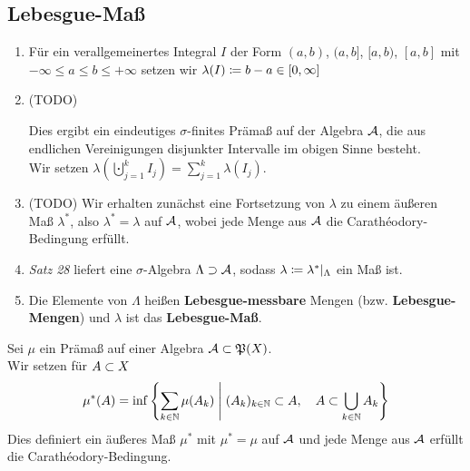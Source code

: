 \documentclass[skript.tex]{subfiles}
\begin{document}
	
	\subsection*{Lebesgue-Maß}
		\begin{enumerate}[(1)]
			\item Für ein verallgemeinertes Integral $I$ der Form
			$(a,b)$, $(a,b]$, $[a,b)$, $[a,b]$ mit \\ $-\infty \leq a \leq b \leq +\infty$ setzen wir
			$\lambda(I) \coloneqq b-a \in [0,\infty]$
			\item (TODO)
				\begin{lem}
					\unskip
					Dies ergibt ein eindeutiges $\sigma$-finites Prämaß auf der Algebra $\mathcal{A}$,
					die aus endlichen Vereinigungen disjunkter Intervalle im obigen Sinne besteht. \\
					Wir setzen
					$\lambda{\left(\bigcupdot_{j=1}^k I_j \right)} = \sum_{j=1}^k \lambda(I_j)$.
				\end{lem}
			\item (TODO) Wir erhalten zunächst eine Fortsetzung von $\lambda$ zu einem äußeren Maß
				$\lambda^*$, also $\lambda^*=\lambda$ auf $\mathcal{A}$, wobei jede Menge aus
				$\mathcal{A}$ die Carathéodory-Bedingung erfüllt.
			\item \emph{Satz 28} liefert eine $\sigma$-Algebra $\Lambda\supset\mathcal{A}$, sodass 
				$\lambda \coloneqq \lambda^*{\mid_\Lambda}$ ein Maß ist.
			\item
				\begin{defin}
					\unskip
					Die Elemente von $\Lambda$ heißen \textbf{Lebesgue-messbare} Mengen (bzw.
					\textbf{Lebesgue-Mengen}) und $\lambda$ ist das \textbf{Lebesgue-Maß}.
				\end{defin}
		\end{enumerate}
		
		\addtocounter{cntr}{-3} %
		\begin{lem}[Ad 3]
			Sei $\mu$ ein Prämaß auf einer Algebra $\mathcal{A} \subset \mathfrak{P}(X)$. \\
			Wir setzen für $A \subset X$
			\[
				\mu^*(A) = \inf\left\{ 
				  \sum_{k\in\mathbb{N}} \mu(A_k)
				  \Biggm\vert (A_k)_{k\in\mathbb{N}} \subset A,\quad A \subset \bigcup_{k\in\mathbb{N}} A_k
				\right\}
			\]
			Dies definiert ein äußeres Maß $\mu^*$ mit $\mu^* = \mu$ auf $\mathcal{A}$
			und jede Menge aus $\mathcal{A}$ erfüllt die Carathéodory-Bedingung. %
		\end{lem}
		\addtocounter{cntr}{2} %
		
\end{document}
